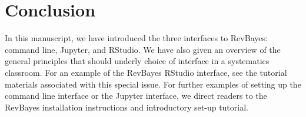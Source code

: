 \documentclass{article}
\begin{document}
\section{Conclusion}

In this manuscript, we have introduced the three interfaces to RevBayes: command line, Jupyter, and RStudio. 
We have also given an overview of the general principles that should underly choice of interface in a systematics classroom.
For an example of the RevBayes RStudio interface, see the tutorial materials associated with this special issue.
For further examples of setting up the command line interface or the Jupyter interface, we direct readers to the RevBayes installation instructions and introductory set-up tutorial.



\end{document}
